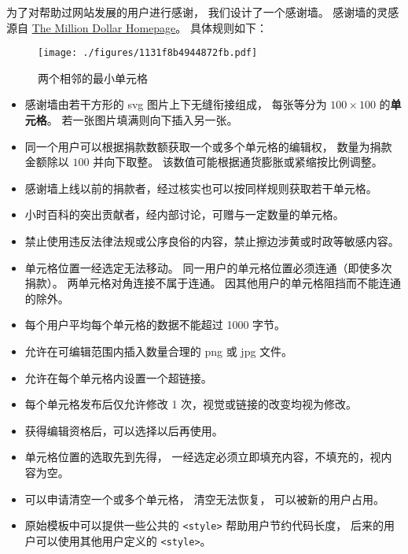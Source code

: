 
\begin{issues}
\issueDraft
{}
\end{issues}

为了对帮助过网站发展的用户进行感谢， 我们设计了一个感谢墙。 感谢墙的灵感源自 \href{https://en.wikipedia.org/wiki/The_Million_Dollar_Homepage}{The Million Dollar Homepage}。 具体规则如下：

\begin{figure}[ht]
\centering
\texttt{[image: ./figures/1131f8b4944872fb.pdf]}
\caption{两个相邻的最小单元格} \label{fig_thanks_1}
\end{figure}

\begin{itemize}

\item 感谢墙由若干方形的 svg 图片上下无缝衔接组成， 每张等分为 $100\times 100$ 的\textbf{单元格}。 若一张图片填满则向下插入另一张。
\item 同一个用户可以根据捐款数额获取一个或多个单元格的编辑权， 数量为捐款金额除以 $100$ 并向下取整。 该数值可能根据通货膨胀或紧缩按比例调整。
\item 感谢墙上线以前的捐款者，经过核实也可以按同样规则获取若干单元格。
\item 小时百科的突出贡献者，经内部讨论，可赠与一定数量的单元格。
\item 禁止使用违反法律法规或公序良俗的内容，禁止擦边涉黄或时政等敏感内容。
\item 单元格位置一经选定无法移动。 同一用户的单元格位置必须连通（即使多次捐款）。 两单元格对角连接不属于连通。 因其他用户的单元格阻挡而不能连通的除外。
\item 每个用户平均每个单元格的数据不能超过 1000 字节。
\item 允许在可编辑范围内插入数量合理的 png 或 jpg 文件。
\item 允许在每个单元格内设置一个超链接。
\item 每个单元格发布后仅允许修改 1 次，视觉或链接的改变均视为修改。
\item 获得编辑资格后，可以选择以后再使用。
\item 单元格位置的选取先到先得， 一经选定必须立即填充内容，不填充的，视内容为空。
\item 可以申请清空一个或多个单元格， 清空无法恢复， 可以被新的用户占用。
\item 原始模板中可以提供一些公共的 \verb`<style>` 帮助用户节约代码长度， 后来的用户可以使用其他用户定义的 \verb`<style>`。
\end{itemize}

